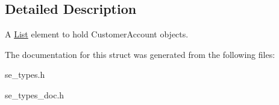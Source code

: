 \subsection{Detailed Description}
A \hyperlink{structList}{List} element to hold Customer\+Account objects. 

The documentation for this struct was generated from the following files\+:\begin{DoxyCompactItemize}
\item 
se\+\_\+types.\+h\item 
se\+\_\+types\+\_\+doc.\+h\end{DoxyCompactItemize}
